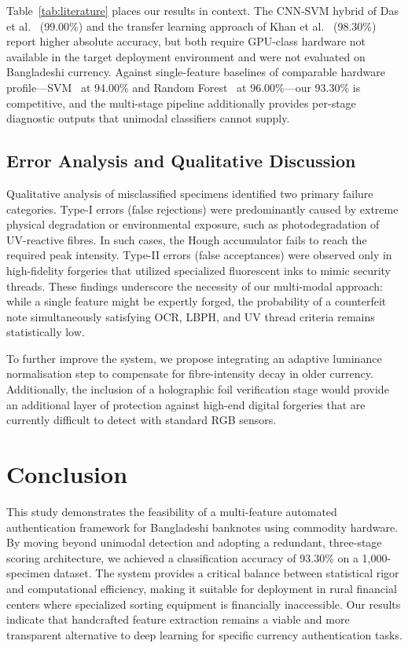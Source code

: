 \documentclass[journal]{IEEEtran}
\begin{document}
Table~\ref{tab:literature} places our results in context. The CNN-SVM hybrid of Das et al.~\cite{das2022} (99.00\%) and the transfer learning approach of Khan et al.~\cite{khan2023} (98.30\%) report higher absolute accuracy, but both require GPU-class hardware not available in the target deployment environment and were not evaluated on Bangladeshi currency. Against single-feature baselines of comparable hardware profile---SVM~\cite{singh2020} at 94.00\% and Random Forest~\cite{rao2020} at 96.00\%---our 93.30\% is competitive, and the multi-stage pipeline additionally provides per-stage diagnostic outputs that unimodal classifiers cannot supply.

\subsection{Error Analysis and Qualitative Discussion}

Qualitative analysis of misclassified specimens identified two primary failure categories. Type-I errors (false rejections) were predominantly caused by extreme physical degradation or environmental exposure, such as photodegradation of UV-reactive fibres. In such cases, the Hough accumulator fails to reach the required peak intensity. Type-II errors (false acceptances) were observed only in high-fidelity forgeries that utilized specialized fluorescent inks to mimic security threads. These findings underscore the necessity of our multi-modal approach: while a single feature might be expertly forged, the probability of a counterfeit note simultaneously satisfying OCR, LBPH, and UV thread criteria remains statistically low.

To further improve the system, we propose integrating an adaptive luminance normalisation step to compensate for fibre-intensity decay in older currency. Additionally, the inclusion of a holographic foil verification stage would provide an additional layer of protection against high-end digital forgeries that are currently difficult to detect with standard RGB sensors.

\section{Conclusion}
\label{sec:conclusion}
This study demonstrates the feasibility of a multi-feature automated authentication framework for Bangladeshi banknotes using commodity hardware. By moving beyond unimodal detection and adopting a redundant, three-stage scoring architecture, we achieved a classification accuracy of 93.30\% on a 1,000-specimen dataset. The system provides a critical balance between statistical rigor and computational efficiency, making it suitable for deployment in rural financial centers where specialized sorting equipment is financially inaccessible. Our results indicate that handcrafted feature extraction remains a viable and more transparent alternative to deep learning for specific currency authentication tasks.
\end{document}
